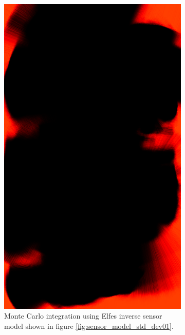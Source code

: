 \begin{figure}[htbp]
	\centering
	\begin{subfigure}[t]{0.45\textwidth}
		\includegraphics[width=\textwidth]{figures/static_mapping/monte_carlo_map_hector}
		\caption{Monte Carlo integration using Elfes inverse sensor model shown in figure \ref{fig:sensor_model_std_dev01}.}
        \label{fig:particle_hector_sensor-croped}
	\end{subfigure}
	\begin{subfigure}[t]{0.45\textwidth}

\end{subfigure}
\end{figure}
